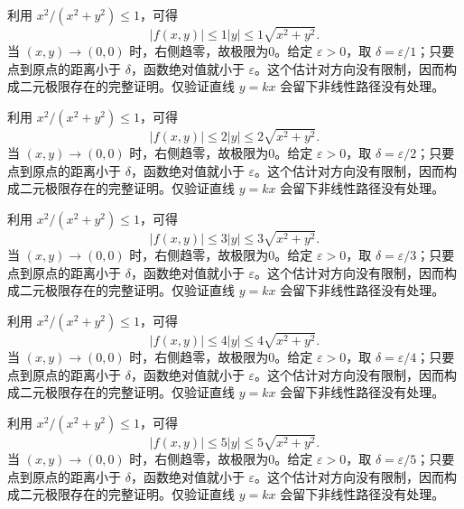 \documentclass[UTF8,12pt,a4paper,fontset=fandol]{ctexart}
\begin{document}
\begin{solve}\label{ans:c32q2}
利用 $x^2/(x^2+y^2)\le1$，可得
\[
|f(x,y)|\le 1|y|\le 1\sqrt{x^2+y^2}.
\]
当 $(x,y)\to(0,0)$ 时，右侧趋零，故极限为0。给定 $\varepsilon>0$，取 $\delta=\varepsilon/1$；只要点到原点的距离小于 $\delta$，函数绝对值就小于 $\varepsilon$。这个估计对方向没有限制，因而构成二元极限存在的完整证明。仅验证直线 $y=kx$ 会留下非线性路径没有处理。
\end{solve}

\begin{solve}\label{ans:c32q3}
利用 $x^2/(x^2+y^2)\le1$，可得
\[
|f(x,y)|\le 2|y|\le 2\sqrt{x^2+y^2}.
\]
当 $(x,y)\to(0,0)$ 时，右侧趋零，故极限为0。给定 $\varepsilon>0$，取 $\delta=\varepsilon/2$；只要点到原点的距离小于 $\delta$，函数绝对值就小于 $\varepsilon$。这个估计对方向没有限制，因而构成二元极限存在的完整证明。仅验证直线 $y=kx$ 会留下非线性路径没有处理。
\end{solve}

\begin{solve}\label{ans:c32q4}
利用 $x^2/(x^2+y^2)\le1$，可得
\[
|f(x,y)|\le 3|y|\le 3\sqrt{x^2+y^2}.
\]
当 $(x,y)\to(0,0)$ 时，右侧趋零，故极限为0。给定 $\varepsilon>0$，取 $\delta=\varepsilon/3$；只要点到原点的距离小于 $\delta$，函数绝对值就小于 $\varepsilon$。这个估计对方向没有限制，因而构成二元极限存在的完整证明。仅验证直线 $y=kx$ 会留下非线性路径没有处理。
\end{solve}

\begin{solve}\label{ans:c32q5}
利用 $x^2/(x^2+y^2)\le1$，可得
\[
|f(x,y)|\le 4|y|\le 4\sqrt{x^2+y^2}.
\]
当 $(x,y)\to(0,0)$ 时，右侧趋零，故极限为0。给定 $\varepsilon>0$，取 $\delta=\varepsilon/4$；只要点到原点的距离小于 $\delta$，函数绝对值就小于 $\varepsilon$。这个估计对方向没有限制，因而构成二元极限存在的完整证明。仅验证直线 $y=kx$ 会留下非线性路径没有处理。
\end{solve}

\begin{solve}\label{ans:c32q6}
利用 $x^2/(x^2+y^2)\le1$，可得
\[
|f(x,y)|\le 5|y|\le 5\sqrt{x^2+y^2}.
\]
当 $(x,y)\to(0,0)$ 时，右侧趋零，故极限为0。给定 $\varepsilon>0$，取 $\delta=\varepsilon/5$；只要点到原点的距离小于 $\delta$，函数绝对值就小于 $\varepsilon$。这个估计对方向没有限制，因而构成二元极限存在的完整证明。仅验证直线 $y=kx$ 会留下非线性路径没有处理。
\end{solve}
\end{document}
